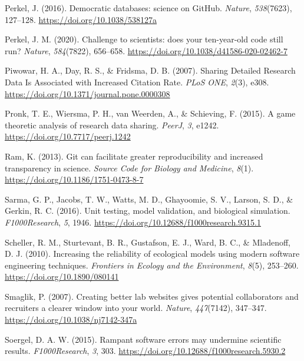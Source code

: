 \begin{CSLReferences}{1}{0}
\leavevmode{}%
Perkel, J. (2016). Democratic databases: science on GitHub. \emph{Nature}, \emph{538}(7623), 127--128. \url{https://doi.org/10.1038/538127a}

\leavevmode{}%
Perkel, J. M. (2020). Challenge to scientists: does your ten-year-old code still run? \emph{Nature}, \emph{584}(7822), 656--658. \url{https://doi.org/10.1038/d41586-020-02462-7}

\leavevmode{}%
Piwowar, H. A., Day, R. S., \& Fridsma, D. B. (2007). Sharing Detailed Research Data Is Associated with Increased Citation Rate. \emph{PLoS ONE}, \emph{2}(3), e308. \url{https://doi.org/10.1371/journal.pone.0000308}

\leavevmode{}%
Pronk, T. E., Wiersma, P. H., van Weerden, A., \& Schieving, F. (2015). A game theoretic analysis of research data sharing. \emph{PeerJ}, \emph{3}, e1242. \url{https://doi.org/10.7717/peerj.1242}

\leavevmode{}%
Ram, K. (2013). Git can facilitate greater reproducibility and increased transparency in science. \emph{Source Code for Biology and Medicine}, \emph{8}(1). \url{https://doi.org/10.1186/1751-0473-8-7}

\leavevmode{}%
Sarma, G. P., Jacobs, T. W., Watts, M. D., Ghayoomie, S. V., Larson, S. D., \& Gerkin, R. C. (2016). Unit testing, model validation, and biological simulation. \emph{F1000Research}, \emph{5}, 1946. \url{https://doi.org/10.12688/f1000research.9315.1}

\leavevmode{}%
Scheller, R. M., Sturtevant, B. R., Gustafson, E. J., Ward, B. C., \& Mladenoff, D. J. (2010). Increasing the reliability of ecological models using modern software engineering techniques. \emph{Frontiers in Ecology and the Environment}, \emph{8}(5), 253--260. \url{https://doi.org/10.1890/080141}

\leavevmode{}%
Smaglik, P. (2007). Creating better lab websites gives potential collaborators and recruiters a clearer window into your world. \emph{Nature}, \emph{447}(7142), 347--347. \url{https://doi.org/10.1038/nj7142-347a}

\leavevmode{}%
Soergel, D. A. W. (2015). Rampant software errors may undermine scientific results. \emph{F1000Research}, \emph{3}, 303. \url{https://doi.org/10.12688/f1000research.5930.2}


\end{CSLReferences}
